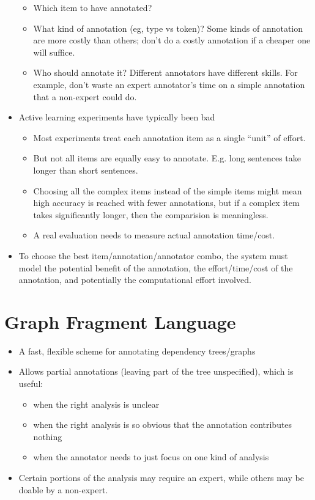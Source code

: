\documentclass[11pt,letterpaper]{article}
\begin{document}
\begin{itemize}
    \begin{itemize}
      \item Which item to have annotated?
      \item What kind of annotation (eg, type vs token)?  Some kinds of annotation are more costly than others; don't do a costly annotation if a cheaper one will suffice.
      \item Who should annotate it?  Different annotators have different skills.  For example, don't waste an expert annotator's time on a simple annotation that a non-expert could do.
    \end{itemize}
  \item Active learning experiments have typically been bad
    \begin{itemize}
      \item Most experiments treat each annotation item as a single ``unit'' of effort.  
      \item But not all items are equally easy to annotate.  E.g. long sentences take longer than short sentences.
      \item Choosing all the complex items instead of the simple items might mean high accuracy is reached with fewer annotations, but if a complex item takes significantly longer, then the comparision is meaningless.
      \item A real evaluation needs to measure actual annotation time/cost.
    \end{itemize}
  \item To choose the best item/annotation/annotator combo, the system must model the potential benefit of the annotation, the effort/time/cost of the annotation, and potentially the computational effort involved. 
\end{itemize}


\section{Graph Fragment Language}

\begin{itemize}
  \item A fast, flexible scheme for annotating dependency trees/graphs
  \item Allows partial annotations (leaving part of the tree unspecified), which is useful:
    \begin{itemize}
      \item when the right analysis is unclear
      \item when the right analysis is so obvious that the annotation contributes nothing
      \item when the annotator needs to just focus on one kind of analysis
    \end{itemize}
  \item Certain portions of the analysis may require an expert, while others may be doable by a non-expert.
\end{itemize}
\end{document}
